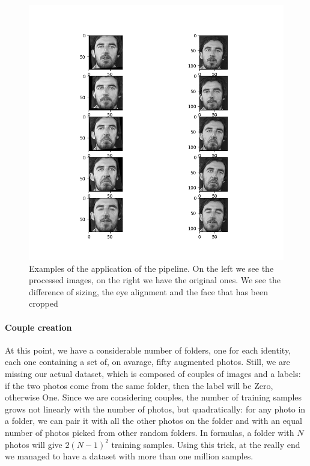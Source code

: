 \begin{figure}[t]
\includegraphics[width=0.8\linewidth]{images/processed.png}
   \caption{Examples of the application of the pipeline. On the left we see the processed images, on the right we have the original ones. We see the difference of sizing, the eye alignment and the face that has been cropped}
\label{fig:long}
\label{fig:onecol}
\end{figure}

\paragraph{Couple creation}
At this point, we have a considerable number of folders, one for each identity, each one containing a set of, on avarage, fifty augmented photos. Still, we are missing our actual dataset, which is composed of couples of images and a labels: if the two photos come from the same folder, then the label will be Zero, otherwise One. Since we are considering couples, the number of training samples grows not linearly with the number of photos, but quadratically: for any photo in a folder, we can pair it with all the other photos on the folder and with an equal number of photos picked from other random folders. In formulas, a folder with $N$ photos will give $2(N-1)^2$ training samples.
Using this trick, at the really end we managed to have a dataset with more than one million samples.



